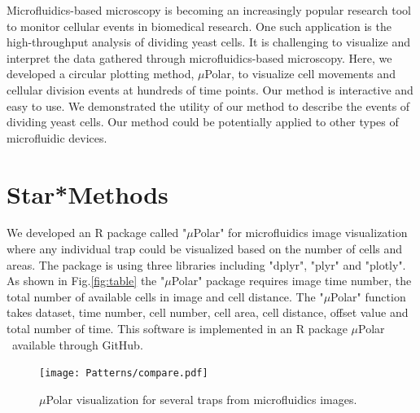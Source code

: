 \documentclass[conference]{IEEEtran}
\begin{document}
Microfluidics-based microscopy is becoming an increasingly popular research tool to monitor cellular events in biomedical research. One such application is the high-throughput analysis of dividing yeast cells. It is challenging to visualize and interpret the data gathered through microfluidics-based microscopy. Here, we developed a circular plotting method, $\mu$Polar, to visualize cell movements and cellular division events at hundreds of time points. Our method is interactive and easy to use. We demonstrated the utility of our method to describe the events of dividing yeast cells. Our method could be potentially applied to other types of microfluidic devices.


\section{Star*Methods}

We developed an R package called "$\mu$Polar" for microfluidics image visualization where any individual trap could be visualized based on the number of cells and areas. The package is using three libraries including "dplyr", "plyr" and "plotly". As shown in Fig.\ref{fig:table} the "$\mu$Polar" package requires image time number, the total number of available cells in image and cell distance. The "$\mu$Polar" function takes dataset, time number, cell number, cell area, cell distance, offset value and total number of time. This software is implemented in an R package $\mu$Polar \ available through GitHub.


\begin{figure}
\centering
\texttt{[image: Patterns/compare.pdf]}
\caption{  $\mu$Polar visualization for several traps from microfluidics images.}
\label{fig:polar}
\end{figure}




 


\end{document}
